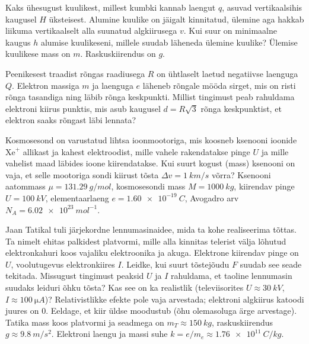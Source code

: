 \documentclass[10pt, twoside]{article}
\begin{document}
{
Kaks ühesugust kuulikest, millest kumbki kannab laengut $q$, asuvad vertikaalsihis kaugusel $H$ üksteisest. Alumine kuulike on jäigalt kinnitatud, ülemine aga hakkab liikuma vertikaalselt alla suunatud algkiirusega $v$. Kui suur on minimaalne kaugus $h$ alumise kuulikeseni, millele suudab läheneda ülemine kuulike? Ülemise kuulikese mass on $m$. Raskuskiirendus on $g$.
\probend
\bigskip


Peenikesest traadist rõngas raadiusega $R$ on ühtlaselt laetud negatiivse laenguga $Q$. Elektron massiga $m$ ja laenguga $e$ läheneb rõngale mööda sirget, mis on risti rõnga tasandiga ning läbib rõnga keskpunkti. Millist tingimust peab rahuldama elektroni kiirus punktis, mis asub kaugusel $d = R\sqrt 3$ rõnga keskpunktist, et elektron saaks rõngast läbi lennata?
\probend
\bigskip


Kosmosesond on varustatud lihtsa ioonmootoriga, mis koosneb ksenooni
ioonide $\mathrm{Xe}^+$ allikast ja kahest elektroodist, mille vahele rakendatakse pinge
$U$ ja mille vahelist maad läbides ioone kiirendatakse. Kui suurt kogust
(mass) ksenooni on vaja, et selle mootoriga sondi kiirust tõsta
$\Delta v=\SI{1}{km/s}$ võrra?
%
Ksenooni aatommass $\mu=\SI{131,29}{g/mol}$, kosmosesondi mass $M=\SI{1000}{kg}$, kiirendav pinge
$U=\SI{100}{kV}$, elementaarlaeng $e=\SI{1,60 e-19}{C}$, Avogadro arv
$N_A= \SI{6,02 e23}{mol^{-1}}$.
\probend
\bigskip


Jaan Tatikal tuli järjekordne lennumasinaidee, mida ta kohe realiseerima tõttas. Ta nimelt ehitas palkidest platvormi, mille alla kinnitas telerist välja lõhutud elektronkahuri koos vajaliku elektroonika ja akuga. Elektrone kiirendav pinge on $U$, voolutugevus elektronkiires $I$. Leidke, kui suurt tõstejõudu $F$ suudab see seade tekitada. Missugust tingimust peaksid $U$ ja $I$ rahuldama, et taoline lennumasin suudaks leiduri õhku tõsta? Kas see on ka realistlik (televiisorites $U \approx \SI{30}{kV}$, $I \approx \SI{100}{\micro A}$)? Relativistlikke efekte pole vaja arvestada; elektroni algkiirus katoodi juures on 0. Eeldage, et kiir üldse moodustub (õhu olemasoluga ärge arvestage). Tatika mass koos platvormi ja seadmega on $m_T \approx \SI{150}{kg}$, raskuskiirendus $g \approx \SI{9,8}{m/s^2}$. Elektroni laengu ja massi suhe $k = e/m_e \approx \SI{1,76e11}{C/kg}$.
\probend
\bigskip

}
\end{document}
